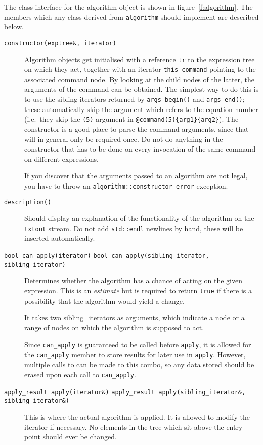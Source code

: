 \documentclass[11pt]{article}
\numberwithin{equation}{section}
\begin{document}
The class interface for the algorithm object is shown in
figure~\ref{f:algorithm}.  The members which any class derived from
{\tt algorithm} should implement are described below.
\begin{description}
\item[{\tt constructor(exptree\&, iterator)}] Algorithm objects get
initialised with a reference {\tt tr} to the expression tree on which
they act, together with an iterator {\tt this\_command} pointing to
the associated command node. By looking at the child nodes of the
latter, the arguments of the command can be obtained. The simplest way
to do this is to use the sibling iterators returned by
\verb|args_begin()| and \verb|args_end()|; these automatically skip
the argument which refers to the equation number (i.e.~they skip the
\verb|(5)| argument in \verb|@command(5){arg1}{arg2}|). The
constructor is a good place to parse the command arguments, since that
will in general only be required once. Do not do anything in the
constructor that has to be done on every invocation of the same
command on different expressions.

If you discover that the arguments passed to an algorithm are 
not legal, you have to throw an {\tt algorithm::constructor\_error}
exception.
\item[{\tt description()}] Should display an explanation of the
functionality of the algorithm on the {\tt txtout} stream. Do not
add \verb|std::endl| newlines by hand, these will be inserted
automatically.
\item[\vbox{\hbox{\tt bool can\_apply(iterator)}
            \hbox{\tt bool can\_apply(sibling\_iterator, sibling\_iterator)}}] 
Determines whether the algorithm has a chance
of acting on the given expression. This is an \emph{estimate} but is
required to return {\tt true} if there is a possibility that the
algorithm would yield a change.  

It takes two sibling\_iterators as arguments, which indicate a node or
a range of nodes on which the algorithm is supposed to act.

Since {\tt can\_apply} is guaranteed to be called before {\tt apply},
it is allowed for the {\tt can\_apply} member to store results for later use in
{\tt apply}. However, multiple calls to can be made to this combo, so
any data stored should be erased upon each call to {\tt can\_apply}.
\item[\vbox{\hbox{\tt apply\_result apply(iterator\&)}
            \hbox{\tt apply\_result apply(sibling\_iterator\&,
              sibling\_iterator\&)}}]
This is where the actual algorithm is applied. It is allowed to
modify the iterator if necessary. No elements in the tree which sit
above the entry point should ever be changed.


\end{description}
\end{document}
